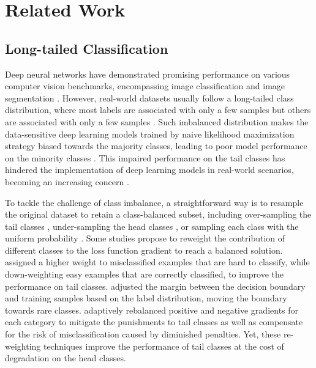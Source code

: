 \section{Related Work}
\subsection{Long-tailed Classification}
Deep neural networks have demonstrated promising performance on various computer vision benchmarks, encompassing image classification  \citep{luo2024surgplan,chen2023star,chen2023surgical,yang2023hierarchical} and image segmentation \citep{yang2022d,zhu2023feddm,chen2024sam}.
However, real-world datasets usually follow a long-tailed class distribution, where most labels are associated with only a few samples but others are associated with only a few samples \citep{li2022long}. 
Such imbalanced distribution makes the data-sensitive deep learning models trained by naive likelihood maximization strategy biased towards the majority classes, leading to poor model performance on the minority classes \citep{lu2023label}. This impaired performance on the tail classes has hindered the implementation of deep learning models in real-world scenarios, becoming an increasing concern \citep{jin2023long}.

To tackle the challenge of class imbalance, a straightforward way is to resample the original dataset to retain a class-balanced subset, including over-sampling the tail classes \citep{more2016survey}, under-sampling the head classes \citep{buda2018systematic}, or sampling each class with the uniform probability \citep{kang2019decoupling}. Some studies \citep{lin2017focal, wang2021seesaw} propose to reweight the contribution of different classes to the loss function gradient to reach a balanced solution. \cite{lin2017focal} assigned a higher weight to misclassified examples that are hard to classify, while down-weighting easy examples that are correctly classified, to improve the performance on tail classes. \cite{cao2019learning} adjusted the margin between the decision boundary and training samples based on the label distribution, moving the boundary towards rare classes. \cite{wang2021seesaw} adaptively rebalanced positive and negative gradients for each category to mitigate the punishments to tail classes as well as compensate for the risk of misclassification caused by diminished penalties.
Yet, these re-weighting techniques improve the performance of tail classes at the cost of degradation on the head classes.


